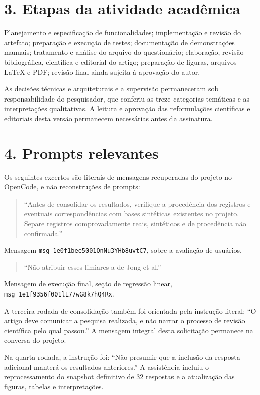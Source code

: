\documentclass[11pt,a4paper]{article}
\begin{document}
\section*{3. Etapas da atividade acadêmica}
Planejamento e especificação de funcionalidades; implementação e revisão do artefato; preparação e execução de testes; documentação de demonstrações manuais; tratamento e análise do arquivo do questionário; elaboração, revisão bibliográfica, científica e editorial do artigo; preparação de figuras, arquivos LaTeX e PDF; revisão final ainda sujeita à aprovação do autor.

As decisões técnicas e arquiteturais e a supervisão permaneceram sob responsabilidade do pesquisador, que conferiu as treze categorias temáticas e as interpretações qualitativas. A leitura e aprovação das reformulações científicas e editoriais desta versão permanecem necessárias antes da assinatura.

\section*{4. Prompts relevantes}
Os seguintes excertos são literais de mensagens recuperadas do projeto no OpenCode, e não reconstruções de prompts:

\begin{quote}
``Antes de consolidar os resultados, verifique a procedência dos registros e eventuais correspondências com bases sintéticas existentes no projeto. Separe registros comprovadamente reais, sintéticos e de procedência não confirmada.''
\end{quote}
Mensagem \texttt{msg\_1e0f1bee5001QnNu3YHb8uvtC7}, sobre a avaliação de usuários.

\begin{quote}
``Não atribuir esses limiares a de Jong et al.''
\end{quote}
Mensagem de execução final, seção de regressão linear, \texttt{msg\_1e1f9356f001lL77wG8k7hQ4Rx}.

A terceira rodada de consolidação também foi orientada pela instrução literal: ``O artigo deve comunicar a pesquisa realizada, e não narrar o processo de revisão científica pelo qual passou.'' A mensagem integral desta solicitação permanece na conversa do projeto.

Na quarta rodada, a instrução foi: ``Não presumir que a inclusão da resposta adicional manterá os resultados anteriores.'' A assistência incluiu o reprocessamento do snapshot definitivo de 32 respostas e a atualização das figuras, tabelas e interpretações.
\end{document}

